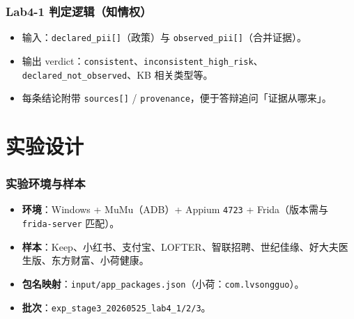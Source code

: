 \documentclass[AutoFakeBold,AutoFakeSlant]{beamer}
\begin{document}
\begin{frame}
    \frametitle{Lab4-1 判定逻辑（知情权）}
    \scriptsize
    \begin{itemize}
        \item 输入：\texttt{declared\_pii[]}（政策）与 \texttt{observed\_pii[]}（合并证据）。
        \item 输出 verdict：\texttt{consistent}、\texttt{inconsistent\_high\_risk}、\texttt{declared\_not\_observed}、KB 相关类型等。
        \item 每条结论附带 \texttt{sources[]} / \texttt{provenance}，便于答辩追问「证据从哪来」。
    \end{itemize}
    \vspace{0.2em}
    \centering
\end{frame}

\section{实验设计}

\begin{frame}
    \frametitle{实验环境与样本}
    \small
    \begin{itemize}
        \item \textbf{环境}：Windows + MuMu（ADB）+ Appium \texttt{4723} + Frida（版本需与 \texttt{frida-server} 匹配）。
        \item \textbf{样本}：Keep、小红书、支付宝、LOFTER、智联招聘、世纪佳缘、好大夫医生版、东方财富、小荷健康。
        \item \textbf{包名映射}：\texttt{input/app\_packages.json}（小荷：\texttt{com.lvsongguo}）。
        \item \textbf{批次}：\texttt{exp\_stage3\_20260525\_lab4\_1/2/3}。
    \end{itemize}
\end{frame}
\end{document}

